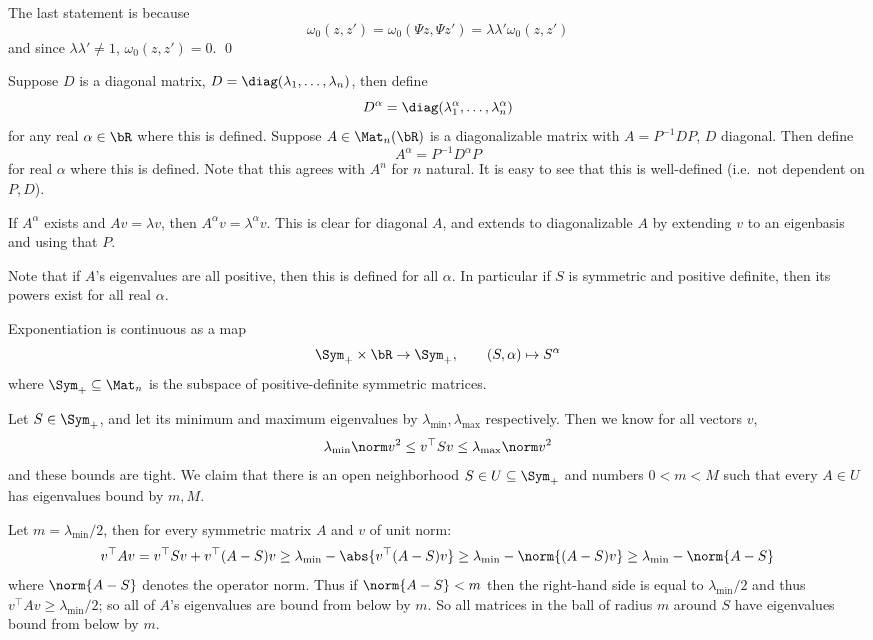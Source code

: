     The last statement is because
    $$ \omega_0(z,z') = \omega_0(\Psi z,\Psi z') = \lambda\lambda'\omega_0(z,z') $$
    and since $\lambda\lambda'\neq1$, $\omega_0(z,z')=0$.
    \qed

\eproof

Suppose $D$ is a diagonal matrix, $D=\diag(\lambda_1,\dots,\lambda_n)$, then define
$$ D^\alpha = \diag(\lambda_1^\alpha,\dots,\lambda_n^\alpha) $$
for any real $\alpha\in\bR$ where this is defined.
Suppose $A\in\Mat_n(\bR)$ is a diagonalizable matrix with $A=P^{-1}DP$, $D$ diagonal.
Then define
$$ A^\alpha = P^{-1}D^\alpha P $$
for real $\alpha$ where this is defined.
Note that this agrees with $A^n$ for $n$ natural.
It is easy to see that this is well-defined (i.e.\ not dependent on $P,D$).

If $A^\alpha$ exists and $Av=\lambda v$, then $A^\alpha v=\lambda^\alpha v$.
This is clear for diagonal $A$, and extends to diagonalizable $A$ by extending $v$ to an eigenbasis and using that $P$.

Note that if $A$'s eigenvalues are all positive, then this is defined for all $\alpha$.
In particular if $S$ is symmetric and positive definite, then its powers exist for all real $\alpha$.

\blemm[name={expiscont}]

    Exponentiation is continuous as a map
    $$ \Sym_+\times\bR\to\Sym_+,\qquad (S,\alpha)\mapsto S^\alpha $$
    where $\Sym_+\subseteq\Mat_n$ is the subspace of positive-definite symmetric matrices.

\elemm

\bproof

    Let $S\in\Sym_+$, and let its minimum and maximum eigenvalues by $\lambda_{\min},\lambda_{\max}$ respectively.
    Then we know for all vectors $v$,
    $$ \lambda_{\min}\norm v^2 \leq v^\top Sv\leq \lambda_{\max}\norm v^2 $$
    and these bounds are tight.
    We claim that there is an open neighborhood $S\in U\subseteq\Sym_+$ and numbers $0<m<M$ such that every $A\in U$ has eigenvalues bound by $m,M$.

    Let $m=\lambda_{\min}/2$, then for every symmetric matrix $A$ and $v$ of unit norm:
    $$ v^\top Av = v^\top Sv + v^\top(A-S)v \geq \lambda_{\min} - \abs{v^\top(A-S)v} \geq \lambda_{\min} - \norm{(A-S)v} \geq \lambda_{\min} - \norm{A-S} $$
    where $\norm{A-S}$ denotes the operator norm.
    Thus if $\norm{A-S}<m$ then the right-hand side is equal to $\lambda_{\min}/2$ and thus $v^\top Av\geq\lambda_{\min}/2$; so all of $A$'s eigenvalues are bound
    from below by $m$.
    So all matrices in the ball of radius $m$ around $S$ have eigenvalues bound from below by $m$.

